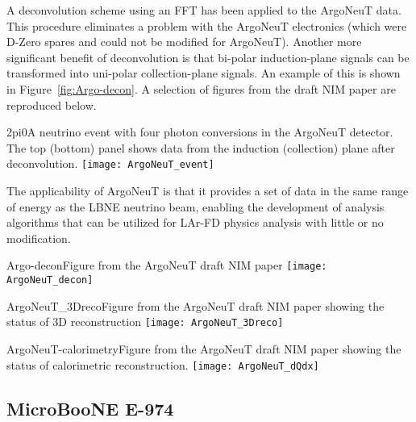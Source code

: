 A deconvolution scheme using an FFT has been applied to the ArgoNeuT data. This procedure eliminates a problem with the ArgoNeuT electronics (which were D-Zero spares and could not be modified for ArgoNeuT). Another more significant benefit of deconvolution is that bi-polar induction-plane signals can be transformed into uni-polar collection-plane signals. An example of this is shown in Figure~\ref{fig:Argo-decon}. A selection of figures from the draft NIM paper are reproduced below.


\begin{cdrfigure}{2pi0}{A neutrino event with four photon conversions in the ArgoNeuT detector. The top (bottom) panel shows data from the induction (collection) plane after deconvolution.}
\texttt{[image: ArgoNeuT\_event]}
\end{cdrfigure}


The applicability of ArgoNeuT is that it provides a set of data in the same range of energy as the LBNE neutrino beam, enabling the development of analysis algorithms that can be utilized for LAr-FD physics analysis with little or no modification.


\begin{cdrfigure}{Argo-decon}{Figure from the ArgoNeuT draft NIM paper}
\texttt{[image: ArgoNeuT\_decon]}
\end{cdrfigure} %

\begin{cdrfigure}{ArgoNeuT_3Dreco}{Figure from the ArgoNeuT draft NIM paper showing the status of 3D reconstruction}
\texttt{[image: ArgoNeuT\_3Dreco]}
\end{cdrfigure}%

\begin{cdrfigure}{ArgoNeuT-calorimetry}{Figure from the ArgoNeuT draft NIM paper showing the status of calorimetric reconstruction.}
\texttt{[image: ArgoNeuT\_dQdx]}
\end{cdrfigure}%

\subsection {MicroBooNE E-974}

